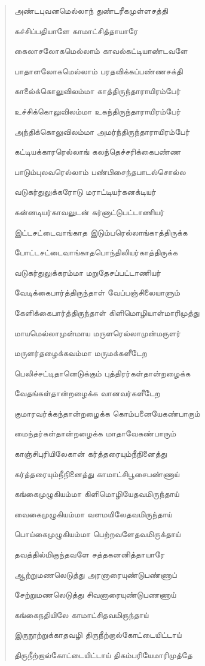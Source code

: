 \documentclass{article}
\begin{document}
\begin{quotation}
{அண்டபுவனமெல்லாந் துண்டரீகமுள்ளசத்தி

கச்சிப்பதியாளே காமாட்சித்தாயாரே

கைலாசலோகமெல்லாம் காவல்கட்டியாண்டவளே

பாதாளலோகமெல்லாம் பரதவிக்கப்பண்ணசக்தி

காலை்க்கொலுவிலம்மா காத்திருந்தாராயிரம்பேர்

உச்சிக்கொலுவிலம்மா உகந்திருந்தாராயிரம்பேர்

அந்திக்கொலுவிலம்மா அமர்ந்திருந்தாராயிரம்பேர்

கட்டியக்காரரெல்லாங் கலந்தெச்சரிக்கைபண்ண

பாடும்புலவரெல்லாம் பண்பிசைந்தபாடல்சொல்ல

வடுகர்துலுக்கரோடு மராட்டியர்கனக்டியர்

கன்னடியர்காவலுடன் கர்னாட்டுபட்டாணியர்

இட்டசட்டைவாங்காத இடும்பரெல்லாங்காத்திருக்க

போட்டசட்டைவாங்காதபொந்திலியர்காத்திருக்க

வடுகர்துலுக்கரம்மா மறுதேசப்பட்டாணியர்

வேடிக்கைபார்த்திருந்தாள் வேப்பஞ்சிலையாளும்

கேளிக்கைபார்த்திருந்தாள் கிளிமொழியாள்மாரிமுத்து

மாயமெல்லாமுன்மாய மருளரெல்லாமுன்மருளர்

மருளர்தழைக்கவம்மா மருமக்களீடேற

பெலிச்சட்டிதானெடுக்கும் புத்திரர்கள்தான்றழைக்க

வேதங்கள்தான்றழைக்க வானவர்களீடேற

குமாரவர்க்கந்தான்றழைக்க கொம்பனையேகண்பாரும்

மைந்தர்கள்தான்றழைக்க மாதாவேகண்பாரும்

காஞ்சிபுரியிலேகான் கர்த்தரையும்நீநினைத்து

கர்த்தரையும்நீநினைத்து காமாட்சிபூசைபண்ணாய்

கங்கைமுழுகியம்மா கிளிமொழியேதவமிருந்தாய்

வைகைமுழுகியம்மா வளமயிலேதவமிருந்தாய்

பொய்கைமுழுகியம்மா பெற்றவளேதவமிருக்தாய்‌

தவத்தில்மிகுந்தவளே சத்தகனனித்தாயாரே

ஆற்றுமணலெடுத்து அரனாரையுண்டுபண்ணாப்

சேற்றுமணலெடுத்து சிவனாரையுண்டுபணணாய்

கங்கைநதியிலே காமாட்சிதவமிருந்தாய்

இருநூற்றுக்காதவழி திருநீற்றால்கோட்டையிட்டாய்

திருநீற்றால்கோட்டையிட்டாய் திகம்பரியேமாரிமுத்தே

}
\end{quotation}
\end{document}
